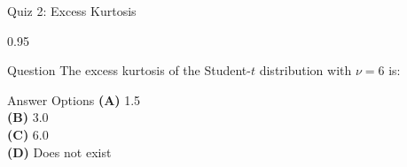 \documentclass[9pt, aspectratio=169, t]{beamer}
\begin{document}
\begin{frame}{Quiz 2: Excess Kurtosis}
\begin{cminipage}{0.95\textwidth}
    \begin{alertblock}{Question}
        The excess kurtosis of the Student-$t$ distribution with $\nu = 6$ is:
    \end{alertblock}

    \vspace{0.5cm}
    \begin{block}{Answer Options}
    \textcolor{MainBlue}{\textbf{(A)}} 1.5\\[3pt]
    \textcolor{MainBlue}{\textbf{(B)}} 3.0\\[3pt]
    \textcolor{MainBlue}{\textbf{(C)}} 6.0\\[3pt]
    \textcolor{MainBlue}{\textbf{(D)}} Does not exist
    \end{block}
\end{cminipage}
\end{frame}
\end{document}
